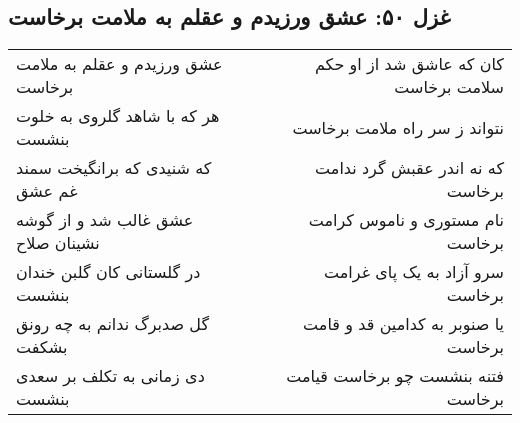 \begin{center}
\section*{غزل ۵۰: عشق ورزیدم و عقلم به ملامت برخاست}
\label{sec:050}
\begin{longtable}{l p{0.5cm} r}
عشق ورزیدم و عقلم به ملامت برخاست
&&
کان که عاشق شد از او حکم سلامت برخاست
\\
هر که با شاهد گلروی به خلوت بنشست
&&
نتواند ز سر راه ملامت برخاست
\\
که شنیدی که برانگیخت سمند غم عشق
&&
که نه اندر عقبش گرد ندامت برخاست
\\
عشق غالب شد و از گوشه نشینان صلاح
&&
نام مستوری و ناموس کرامت برخاست
\\
در گلستانی کان گلبن خندان بنشست
&&
سرو آزاد به یک پای غرامت برخاست
\\
گل صدبرگ ندانم به چه رونق بشکفت
&&
یا صنوبر به کدامین قد و قامت برخاست
\\
دی زمانی به تکلف بر سعدی بنشست
&&
فتنه بنشست چو برخاست قیامت برخاست
\\
\end{longtable}
\end{center}
